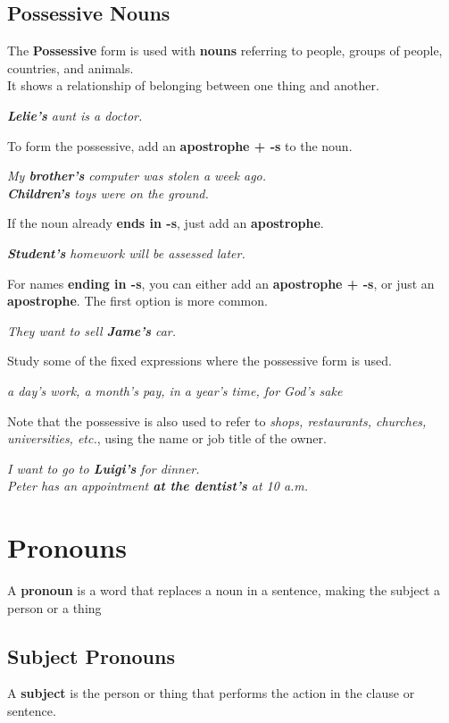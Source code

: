 \documentclass[hidelinks,10pt,a4paper]{article}
\begin{document}
\subsection{Possessive Nouns}
The \textbf{Possessive} form is used with \textbf{nouns} referring to people, groups of people, countries, and animals.\\
It shows a relationship of belonging between one thing and another.
\begin{center}
		\textit{ \textbf{Lelie's} aunt is a doctor.}
\end{center}
To form the possessive, add an \textbf{apostrophe + -s} to the noun.
\begin{center}
\textit{My \textbf{brother's} computer was stolen a week ago.\\
		\textbf{Children's} toys were on the ground.\\}
\end{center}
If the noun already \textbf{ends in -s}, just add an \textbf{apostrophe}.
\begin{center}
\textit{ \textbf{Student's} homework will be assessed later.}
\end{center}
For names \textbf{ending in -s}, you can either add an \textbf{apostrophe + -s}, or just an \textbf{apostrophe}. The first option is more common.
\begin{center}
\textit{They want to sell \textbf{Jame's }car.}
\end{center}
Study some of the fixed expressions where the possessive form is used.
\begin{center}
\textit{a day's work, a month's pay, in a year's time, for God's sake}
\end{center}
Note that the possessive is also used to refer to \textit{shops, restaurants, churches, universities, etc.}, using the name or job title of the owner.
\begin{center}
\textit{
		I want to go to \textbf{Luigi's} for dinner.\\
		Peter has an appointment \textbf{at the dentist's} at 10 a.m.
}
\end{center}
\section{Pronouns}
A \textbf{pronoun} is a word that replaces a noun in a sentence, making the subject a person or a thing
\subsection{Subject Pronouns}
A \textbf{subject} is the person or thing that performs the action in the clause or sentence.
\end{document}
